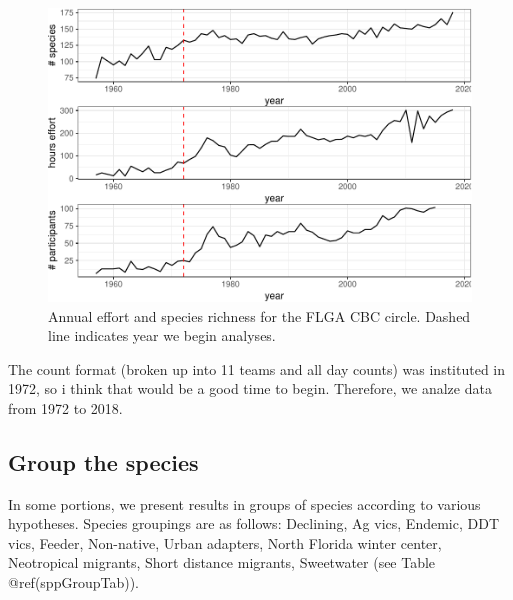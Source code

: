 \documentclass[]{article}
\begin{document}
\begin{figure}
\centering
\includegraphics{runThrough_files/figure-latex/effortPlots-1.pdf}
\caption{Annual effort and species richness for the FLGA CBC circle.
Dashed line indicates year we begin analyses.}
\end{figure}

The count format (broken up into 11 teams and all day counts) was
instituted in 1972, so i think that would be a good time to begin.
Therefore, we analze data from 1972 to 2018.

\subsection{Group the species}\label{group-the-species}

In some portions, we present results in groups of species according to
various hypotheses. Species groupings are as follows: Declining, Ag
vics, Endemic, DDT vics, Feeder, Non-native, Urban adapters, North
Florida winter center, Neotropical migrants, Short distance migrants,
Sweetwater (see Table @ref(sppGroupTab)).

\begingroup\fontsize{9}{11}\selectfont
\end{document}
